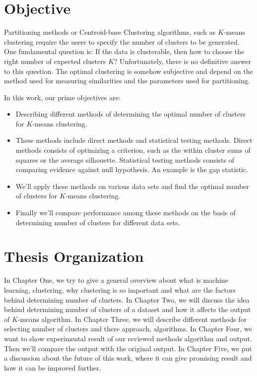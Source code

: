 \section{Objective}
Partitioning methods or Centroid-base Clustering algorithms, such as $K$-means clustering require the users to specify
the number of clusters to be generated. One fundamental question is: If the data is clusterable, then how to choose the
right number of expected clusters $K$? Unfortunately, there is no definitive answer to this question. The optimal
clustering is somehow subjective and depend on the method used for measuring similarities and the parameters used for
partitioning.

In this work, our prime objectives are:

\begin{itemize}
\item Describing different methods of determining the optimal number of clusters for $K$-means clustering.
\item These methods include direct methods and statistical testing methods. Direct methods consists of
optimizing a criterion, such as the within cluster sums of squares or the average silhouette. Statistical
testing methods consists of comparing evidence against null hypothesis. An example is the gap statistic.
\item We'll apply these methods on various data sets and find the optimal number of clusters for $K$-means clustering.
\item Finally we'll compare performance among these methods on the basis of determining number of clusters for
different data sets.
\end{itemize}

\section{Thesis Organization}
In Chapter One, we try to give a general overview about what is machine learning, clustering,
why clustering is so important and what are the factors behind determining number of clusters.
In Chapter Two, we will discuss the idea behind determining number of clusters of a dataset and
how it affects the output of $K$-means algorithm.
In Chapter Three, we will describe different methods for selecting number of clusters and there approach,
algorithms.
In Chapter Four, we want to show experimental result of our reviewed methods algorithm and output.
Then we'll compare the output with the original output.
In Chapter Five, we put a discussion about the future of this work, where it can give promising
result and how it can be improved further.

\endinput

